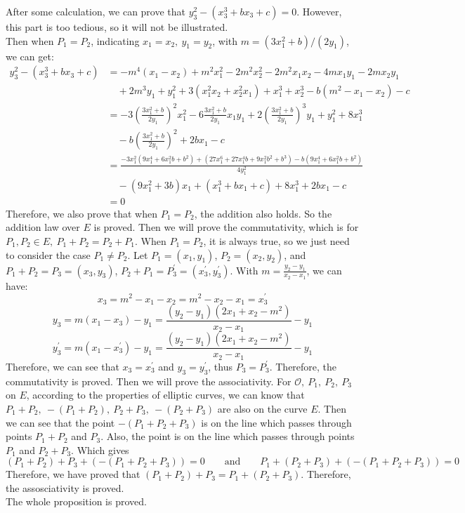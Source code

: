 \documentclass[12pt, a4paper]{article}
\begin{document}
After some calculation, we can prove that $y_3^2 - (x_3^3 + bx_3 + c) = 0$. However, this part is too tedious, 
so it will not be illustrated.\\
Then when $P_1 = P_2$, indicating $x_1 = x_2,\ y_1 = y_2$, with $m = (3x_1^2 + b) / (2y_1)$, we can get:
\begin{align*}
    y_3^2 - (x_3^3 + bx_3 + c) &= -m^4(x_1 - x_2) + m^2x_1^2 - 2m^2x_2^2 - 2m^2x_1x_2 - 4mx_1y_1 - 2mx_2y_1\\
                               &\quad + 2m^3y_1 + y_1^2 + 3(x_1^2x_2 + x_2^2x_1) + x_1^3 + x_2^3 - b(m^2 - x_1 - x_2) - c\\
                               &= -3(\frac{3x_1^2+b}{2y_1})^2x_1^2 - 6\frac{3x_1^2+b}{2y_1}x_1y_1 + 2(\frac{3x_1^2+b}{2y_1})^3y_1 
                                  + y_1^2 + 8x_1^3\\
                               &\quad - b(\frac{3x_1^2+b}{2y_1})^2 + 2bx_1 - c\\
                               &= \frac{-3x_1^2(9x_1^4 + 6x_1^2b + b^2) + (27x_1^6 + 27x_1^4b + 9x_1^2b^2 + b^3) - b(9x_1^4 + 6x_1^2b + b^2)}{4y_1^2}\\
                               &\quad - (9x_1^2 + 3b)x_1 + (x_1^3 + bx_1 + c) + 8x_1^3 + 2bx_1 -c\\
                               &= 0
\end{align*}
Therefore, we also prove that when $P_1 = P_2$, the addition also holds. So the addition law over $E$ is proved.\newline
\newline
Then we will prove the commutativity, which is for $P_1, P_2 \in E,\ P_1 + P_2 = P_2 + P_1$. When $P_1 = P_2$, 
it is always true, so we just need to consider the case $P_1 \neq P_2$. Let $P_1 = (x_1, y_1)$, $P_2 = (x_2, y_2)$, 
and $P_1 + P_2 = P_3 = (x_3, y_3)$, $P_2 + P_1 = P_3^\prime = (x_3^\prime, y_3^\prime)$. With $m = \frac{y_2-y_1}{x_2-x_1}$, we can have:
$$x_3 = m^2 - x_1 - x_2 = m^2 - x_2 - x_1 = x_3^\prime$$
$$y_3 = m(x_1 - x_3) - y_1 = \frac{(y_2 - y_1)(2x_1 + x_2 - m^2)}{x_2 - x_1} - y_1$$
$$y_3^\prime = m(x_1 - x_3^\prime) - y_1 = \frac{(y_2 - y_1)(2x_1 + x_2 - m^2)}{x_2 - x_1} - y_1$$
Therefore, we can see that $x_3 = x_3^\prime$ and $y_3 = y_3^\prime$, thus $P_3 = P_3^\prime$. Therefore, 
the commutativity is proved.\newline
\newline
Then we will prove the associativity. For $\mathcal{O},\ P_1,\ P_2,\ P_3$ on $E$, according to the properties of elliptic curves, 
we can know that $P_1 + P_2,\ -(P_1 + P_2),\ P_2 + P_3,\ -(P_2 + P_3)$ are also on the curve $E$. 
Then we can see that the point $-(P_1 + P_2 + P_3)$ is on the line which passes through points $P_1 + P_2$ and $P_3$. 
Also, the point is on the line which passes through points $P_1$ and $P_2 + P_3$. Which gives 
$$(P_1 + P_2) + P_3 + (-(P_1 + P_2 + P_3)) = 0 \qquad \text{and} \qquad P_1 + (P_2 + P_3) + (-(P_1 + P_2 + P_3)) = 0$$
Therefore, we have proved that $(P_1 + P_2) + P_3 = P_1 + (P_2 + P_3)$. Therefore, the assosciativity is proved.\\
The whole proposition is proved.
\end{document}
